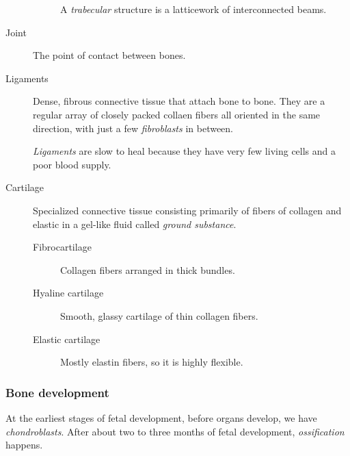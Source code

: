 \documentclass[11pt]{article}
\begin{document}
\begin{description}
\begin{description}
A \emph{trabecular} structure is a latticework of interconnected beams.
\end{description}

\item[{Joint}] The point of contact between bones.

\item[{Ligaments}] Dense, fibrous connective tissue that attach bone to bone.
They are a regular array of closely packed collaen fibers all oriented
in the same direction, with just a few \emph{fibroblasts} in between.

\emph{Ligaments} are slow to heal because they have very few living cells and
a poor blood supply.

\item[{Cartilage}] Specialized connective tissue consisting primarily of fibers
of collagen and elastic in a gel-like fluid called \emph{ground substance}.

\begin{description}
\item[{Fibrocartilage}] Collagen fibers arranged in thick bundles.
\item[{Hyaline cartilage}] Smooth, glassy cartilage of thin collagen fibers.
\item[{Elastic cartilage}] Mostly elastin fibers, so it is highly flexible.
\end{description}
\end{description}

\subsubsection{Bone development}
\label{sec:orge9d0d17}
At the earliest stages of fetal development, before organs develop, we have
\emph{chondroblasts}. After about two to three months of fetal development,
\emph{ossification} happens.
\end{document}
